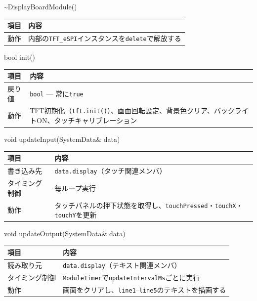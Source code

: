 \begin{funcblock}{\textasciitilde DisplayBoardModule()}
\begin{tabularx}{\textwidth}{l X}
\toprule
\textbf{項目} & \textbf{内容} \\
\midrule
動作   & 内部の\texttt{TFT\_eSPI}インスタンスを\texttt{delete}で解放する \\
\bottomrule
\end{tabularx}
\end{funcblock}

\begin{funcblock}{bool init()}
\begin{tabularx}{\textwidth}{l X}
\toprule
\textbf{項目} & \textbf{内容} \\
\midrule
戻り値   & \texttt{bool} --- 常に\texttt{true} \\
動作     & TFT初期化（\texttt{tft.init()}）、画面回転設定、背景色クリア、バックライトON、タッチキャリブレーション \\
\bottomrule
\end{tabularx}
\end{funcblock}

\begin{funcblock}{void updateInput(SystemData\& data)}
\begin{tabularx}{\textwidth}{l X}
\toprule
\textbf{項目} & \textbf{内容} \\
\midrule
書き込み先     & \texttt{data.display}（タッチ関連メンバ） \\
タイミング制御 & 毎ループ実行 \\
動作           & タッチパネルの押下状態を取得し、\texttt{touchPressed}・\texttt{touchX}・\texttt{touchY}を更新 \\
\bottomrule
\end{tabularx}
\end{funcblock}

\begin{funcblock}{void updateOutput(SystemData\& data)}
\begin{tabularx}{\textwidth}{l X}
\toprule
\textbf{項目} & \textbf{内容} \\
\midrule
読み取り元     & \texttt{data.display}（テキスト関連メンバ） \\
タイミング制御 & \texttt{ModuleTimer}で\texttt{updateIntervalMs}ごとに実行 \\
動作           & 画面をクリアし、\texttt{line1}--\texttt{line5}のテキストを描画する \\
\bottomrule
\end{tabularx}
\end{funcblock}

